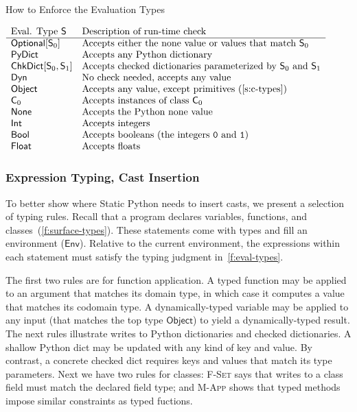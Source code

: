 \documentclass[english,cleveref,submission]{programming}
\newcommand{\SP}{Static Python}
\newcommand{\code}[1]{\texttt{#1}}
\newcommand{\typefont}[1]{\mathsf{#1}}
\newcommand{\paramtype}[2]{#1[#2]}
\newcommand{\spteval}{\typefont{S}}
\newcommand{\sptclass}{\typefont{C}}
\newcommand{\sptint}{\typefont{Int}}
\newcommand{\sptbool}{\typefont{Bool}}
\newcommand{\sptfloat}{\typefont{Float}}
\newcommand{\sptdyn}{\typefont{Dyn}}
\newcommand{\sptobject}{\typefont{Object}}
\newcommand{\sptnone}{\typefont{None}}
\newcommand{\sptoptional}[1]{\paramtype{\typefont{Optional}}{#1}}
\newcommand{\sptrawpydict}{\typefont{PyDict}}
\newcommand{\sptchkdict}[2]{\paramtype{\typefont{ChkDict}}{#1, #2}}
\newcommand{\sptenv}{\typefont{Env}}
\newcommand{\trule}[1]{\textsc{#1}}
\begin{document}
\begin{table}[t]
  \caption{How to Enforce the Evaluation Types}
  \label{t:cast}

  \(\begin{array}{l@{\quad}l}
    \mbox{Eval. Type $\spteval$} & \mbox{Description of run-time check} \\\hline
    \sptoptional{\spteval_0} & \mbox{Accepts either the none value or values that match $\spteval_0$} \\
    \sptrawpydict & \mbox{Accepts any Python dictionary} \\
    \sptchkdict{\spteval_0}{\spteval_1} & \mbox{Accepts checked dictionaries parameterized by $\spteval_0$ and $\spteval_1$} \\
    \sptdyn & \mbox{No check needed, accepts any value} \\
    \sptobject & \mbox{Accepts any value, except primitives~(\cref{s:c-types})} \\
    \sptclass_0 & \mbox{Accepts instances of class $\sptclass_0$} \\
    \sptnone & \mbox{Accepts the Python none value} \\
    \sptint & \mbox{Accepts integers} \\
    \sptbool & \mbox{Accepts booleans (the integers \code{0} and \code{1})} \\
    \sptfloat & \mbox{Accepts floats}
  \end{array}\)
\end{table}


\subsubsection{Expression Typing, Cast Insertion}

To better show where \SP{} needs to insert casts, we present a selection of typing rules.
Recall that a program declares variables, functions, and classes~(\cref{f:surface-types}).
These statements come with types and fill an environment ($\sptenv$).
Relative to the current environment, the expressions within each statement must
satisfy the typing judgment in~\cref{f:eval-types}.

The first two rules are for function application.
A typed function may be applied to an argument that matches its domain type,
in which case it computes a value that matches its codomain type.
A dynamically-typed variable may be applied to any input (that matches the top
type $\sptobject$) to yield a dynamically-typed result.
The next rules illustrate writes to Python dictionaries and checked dictionaries.
A shallow Python dict may be updated with any kind of key and value.
By contrast, a concrete checked dict requires keys and values that match its type parameters.
Next we have two rules for classes:
\trule{F-Set} says that writes to a class field must match the declared field
type; and \trule{M-App} shows that typed methods impose similar constraints as
typed fuctions.
\end{document}

